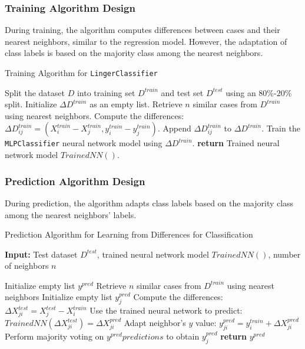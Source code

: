 \documentclass[a4paper, 12pt]{report}
\begin{document}
\subsubsection{Training Algorithm Design}
During training, the algorithm computes differences between cases and their nearest neighbors, similar to the regression model. 
However, the adaptation of class labels is based on the majority class among the nearest neighbors.

\begin{algorithm}[H]
    \caption{Training Algorithm for \texttt{LingerClassifier}}
    \label{alg:linger_classifier_train}
    \begin{algorithmic}
        \State Split the dataset $D$ into training set $D^{train}$ and test set $D^{test}$ using an $80\%$-$20\%$ split.
        \State Initialize $\Delta D^{train}$ as an empty list.
            \State Retrieve $n$ similar cases from $D^{train}$ using nearest neighbors.
                \State Compute the differences: $\Delta D^{train}_{ij} = (X^{train}_i - X^{train}_j, y^{train}_i - y^{train}_j)$.
                \State Append $\Delta D^{train}_{ij}$ to $\Delta D^{train}$.
            \EndFor
        \EndFor
        \State Train the \texttt{MLPClassifier} neural network model using $\Delta D^{train}$.
        \State \textbf{return} Trained neural network model $Trained NN()$.
    \end{algorithmic}
\end{algorithm}

\subsubsection{Prediction Algorithm Design}
During prediction, the algorithm adapts class labels based on the majority class among the nearest neighbors' labels.

\begin{algorithm}
	\caption{Prediction Algorithm for Learning from Differences for Classification}
	\label{alg:learning_from_differences_predict_classification}
	\textbf{Input:} Test dataset $D^{test}$, trained neural network model $Trained NN()$, number of neighbors $n$
	\begin{algorithmic}[1]
        \State Initialize empty list $y^{pred}$
			\State Retrieve $n$ similar cases from $D^{train}$ using nearest neighbors
			\State Initialize empty list $y^{pred}_j$
				\State Compute the differences: $\Delta X^{test}_{ji} = X^{test}_j - X^{train}_i$
				\State Use the trained neural network to predict: $Trained NN(\Delta X^{test}_{ji}) = \Delta X^{pred}_{ji}$
				\State Adapt neighbor's $y$ value: $y^{pred}_{ji} = y^{train}_i + \Delta X^{pred}_{ji}$
			\EndFor
			\State Perform majority voting on $y^{pred}predictions$ to obtain $y^{pred}_j$
		\EndFor
		\State \textbf{return} $y^{pred}$
	\end{algorithmic}
\end{algorithm}
\end{document}
